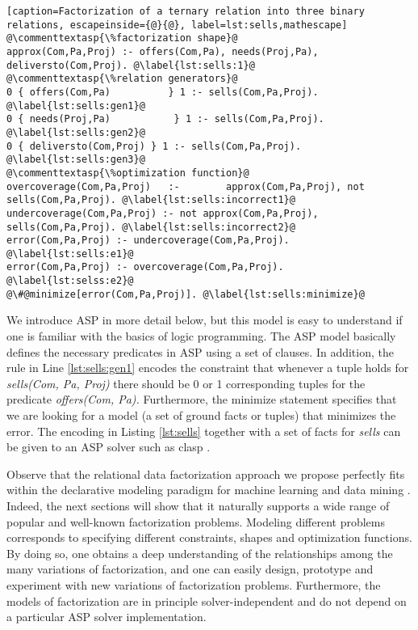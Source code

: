 \begin{lstlisting}[caption=Factorization of a ternary relation into three binary relations, escapeinside={@}{@}, label=lst:sells,mathescape] 
@\commenttextasp{\%factorization shape}@
approx(Com,Pa,Proj) :- offers(Com,Pa), needs(Proj,Pa), deliversto(Com,Proj). @\label{lst:sells:1}@
@\commenttextasp{\%relation generators}@
0 { offers(Com,Pa)          } 1 :- sells(Com,Pa,Proj). @\label{lst:sells:gen1}@
0 { needs(Proj,Pa)           } 1 :- sells(Com,Pa,Proj). @\label{lst:sells:gen2}@
0 { deliversto(Com,Proj) } 1 :- sells(Com,Pa,Proj). @\label{lst:sells:gen3}@
@\commenttextasp{\%optimization function}@
overcoverage(Com,Pa,Proj)   :-        approx(Com,Pa,Proj), not sells(Com,Pa,Proj). @\label{lst:sells:incorrect1}@
undercoverage(Com,Pa,Proj) :- not approx(Com,Pa,Proj),        sells(Com,Pa,Proj). @\label{lst:sells:incorrect2}@
error(Com,Pa,Proj) :- undercoverage(Com,Pa,Proj). @\label{lst:sells:e1}@
error(Com,Pa,Proj) :- overcoverage(Com,Pa,Proj). @\label{lst:selss:e2}@
@\#@minimize[error(Com,Pa,Proj)]. @\label{lst:sells:minimize}@
\end{lstlisting}

We introduce ASP in more detail below, but this model is easy to understand if one is familiar with the basics of logic programming. The ASP model basically defines the necessary predicates in ASP using a set of clauses. In addition, the rule in Line \ref{lst:sells:gen1} encodes the constraint that whenever a tuple holds for \textit{sells(Com, Pa, Proj)}
there should be 0 or 1 corresponding tuples for the predicate \textit{offers(Com, Pa).}
Furthermore, the minimize statement specifies that we are looking for a model (a set of ground facts or tuples) that minimizes the error.  The encoding in Listing  \ref{lst:sells} together with a set of facts for \textit{sells}
can be given to an ASP solver such as clasp \parencite{gebser2011potassco}. %


Observe that the relational data factorization approach we propose perfectly fits within the declarative modeling paradigm for machine learning and data mining \parencite{DeRaedtECML12}.  Indeed, the next sections will show that it naturally supports a wide range of popular and well-known factorization problems. 
Modeling different problems corresponds to specifying different constraints, shapes and optimization functions.
By doing so, one obtains a deep understanding of the relationships among the many variations of factorization, 
and one can easily design, prototype and experiment with new variations of factorization problems. 
Furthermore, the models of factorization are in principle solver-independent and do not depend on a particular ASP solver implementation.   

